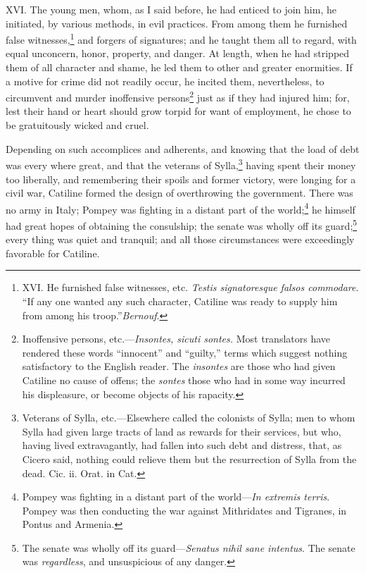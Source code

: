 XVI. The young men, whom, as I said before, he had enticed to join
him, he initiated, by various methods, in evil practices. From among
them he furnished false witnesses,\footnote{XVI. He furnished false witnesses, etc. \emph{Testis signatoresque
falsos commodare}. ``If any one wanted any such character, Catiline was
ready to supply him from among his troop.''\emph{Bernouf}.} and forgers of signatures; and
he taught them all to regard, with equal unconcern, honor, property,
and danger. At length, when he had stripped them of all character and
shame, he led them to other and greater enormities. If a motive for
crime did not readily occur, he incited them, nevertheless, to
circumvent and murder inoffensive persons\footnote{Inoffensive persons, etc.—\emph{Insontes, sicuti sontes.} Most
translators have rendered these words ``innocent'' and ``guilty,'' terms
which suggest nothing satisfactory to the English reader. The
\emph{insontes} are those who had given Catiline no cause of offens; the
\emph{sontes} those who had in some way incurred his displeasure, or become
objects of his rapacity.} just as if they had
injured him; for, lest their hand or heart should grow torpid for want
of employment, he chose to be gratuitously wicked and cruel.

Depending on such accomplices and adherents, and knowing that the load
of debt was every where great, and that the veterans of Sylla,\footnote{Veterans of Sylla, etc.—Elsewhere called the colonists of
Sylla; men to whom Sylla had given large tracts of land as rewards for
their services, but who, having lived extravagantly, had fallen into
such debt and distress, that, as Cicero said, nothing could relieve
them but the resurrection of Sylla from the dead. Cic. ii. Orat. in
Cat.}
having spent their money too liberally, and remembering their spoils
and former victory, were longing for a civil war, Catiline formed the
design of overthrowing the government. There was no army in Italy;
Pompey was fighting in a distant part of the world;\footnote{Pompey was fighting in a distant part of the world—\emph{In extremis
terris}. Pompey was then conducting the war against Mithridates and
Tigranes, in Pontus and Armenia.} he himself had
great hopes of obtaining the consulship; the senate was wholly off its
guard;\footnote{The senate was wholly off its guard—\emph{Senatus nihil sane intentus}.
The senate was \emph{regardless}, and unsuspicious of any danger.} every thing was quiet and tranquil; and all those
circumstances were exceedingly favorable for Catiline.

